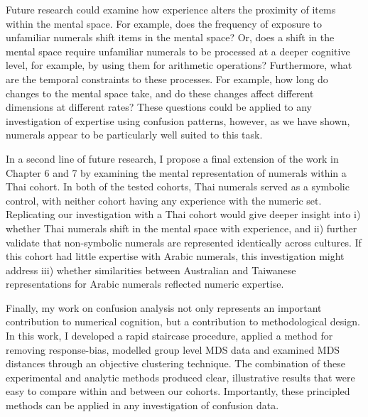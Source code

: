 Future research could examine how experience alters the proximity of items within the mental space. For example, does the frequency of exposure to unfamiliar numerals shift items in the mental space? Or, does a shift in the mental space require unfamiliar numerals to be processed at a deeper cognitive level, for example, by using them for arithmetic operations? Furthermore, what are the temporal constraints to these processes. For example, how long do changes to the mental space take, and do these changes affect different dimensions at different rates? These questions could be applied to any investigation of expertise using confusion patterns, however, as we have shown, numerals appear to be particularly well suited to this task. 

In a second line of future research, I propose a final extension of the work in Chapter 6 and 7 by examining the mental representation of numerals within a Thai cohort. In both of the tested cohorts, Thai numerals served as a symbolic control, with neither cohort having any experience with the numeric set. Replicating our investigation with a Thai cohort would give deeper insight into i) whether Thai numerals shift in the mental space with experience, and ii) further validate that non-symbolic numerals are represented identically across cultures. If this cohort had little expertise with Arabic numerals, this investigation might address iii) whether similarities between Australian and Taiwanese representations for Arabic numerals reflected numeric expertise. 

Finally, my work on confusion analysis not only represents an important contribution to numerical cognition, but a contribution to methodological design. In this work, I developed a rapid staircase procedure, applied a method for removing response-bias, modelled group level MDS data and examined MDS distances through an objective clustering technique. The combination of these experimental and analytic methods produced clear, illustrative results that were easy to compare within and between our cohorts. Importantly, these principled methods can be applied in any investigation of confusion data. 


